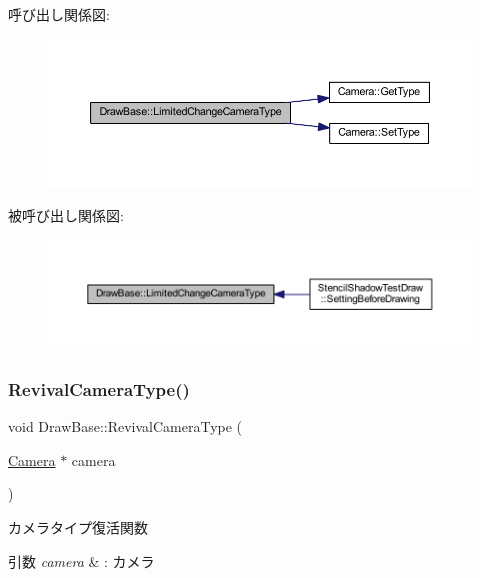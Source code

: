 呼び出し関係図\+:\nopagebreak
\begin{figure}[H]
\begin{center}
\leavevmode
\includegraphics[width=350pt]{class_draw_base_aa18abd488181eed72822f92a0f2521fe_cgraph}
\end{center}
\end{figure}
被呼び出し関係図\+:\nopagebreak
\begin{figure}[H]
\begin{center}
\leavevmode
\includegraphics[width=350pt]{class_draw_base_aa18abd488181eed72822f92a0f2521fe_icgraph}
\end{center}
\end{figure}
\mbox{\label{class_draw_base_a48b144e61928b7658c7a849017e40c79}} 
\subsubsection{\texorpdfstring{Revival\+Camera\+Type()}{RevivalCameraType()}}
{\footnotesize\ttfamily void Draw\+Base\+::\+Revival\+Camera\+Type (\begin{DoxyParamCaption}\item[{\mbox{\hyperlink{class_camera}{Camera}} $\ast$}]{camera }\end{DoxyParamCaption})\hspace{0.3cm}{\ttfamily [inline]}}



カメラタイプ復活関数 


\begin{DoxyParams}{引数}
{\em camera} & \+: カメラ \\
\hline
\end{DoxyParams}


